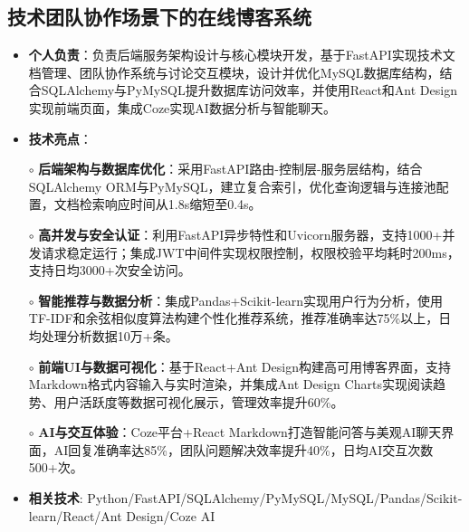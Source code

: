 \subsection{\textbf{技术团队协作场景下的在线博客系统} \hspace{2cm}{2025.06 -- 2025.07}}
  \begin{normalsize}
    \begin{itemize}
    \item \textbf{个人负责}：负责后端服务架构设计与核心模块开发，基于FastAPI实现技术文档管理、团队协作系统与讨论交互模块，设计并优化MySQL数据库结构，结合SQLAlchemy与PyMySQL提升数据库访问效率，并使用React和Ant Design实现前端页面，集成Coze实现AI数据分析与智能聊天。
    \item \textbf{技术亮点}：
    \setlength{\itemindent}{1em} %
      \item[$\circ$] \textbf{后端架构与数据库优化}：采用FastAPI路由-控制层-服务层结构，结合SQLAlchemy ORM与PyMySQL，建立复合索引，优化查询逻辑与连接池配置，文档检索响应时间从1.8s缩短至0.4s。
      \item[$\circ$] \textbf{高并发与安全认证}：利用FastAPI异步特性和Uvicorn服务器，支持1000+并发请求稳定运行；集成JWT中间件实现权限控制，权限校验平均耗时200ms，支持日均3000+次安全访问。
      \item[$\circ$] \textbf{智能推荐与数据分析}：集成Pandas+Scikit-learn实现用户行为分析，使用TF-IDF和余弦相似度算法构建个性化推荐系统，推荐准确率达75\%以上，日均处理分析数据10万+条。
      \item[$\circ$] \textbf{前端UI与数据可视化}：基于React+Ant Design构建高可用博客界面，支持Markdown格式内容输入与实时渲染，并集成Ant Design Charts实现阅读趋势、用户活跃度等数据可视化展示，管理效率提升60\%。
      \item[$\circ$] \textbf{AI与交互体验}：Coze平台+React Markdown打造智能问答与美观AI聊天界面，AI回复准确率达85\%，团队问题解决效率提升40\%，日均AI交互次数500+次。
    \setlength{\itemindent}{0em} %
    \item \textbf{相关技术}: Python/FastAPI/SQLAlchemy/PyMySQL/MySQL/Pandas/Scikit-learn/React/Ant Design/Coze AI
    \end{itemize}
  \end{normalsize}